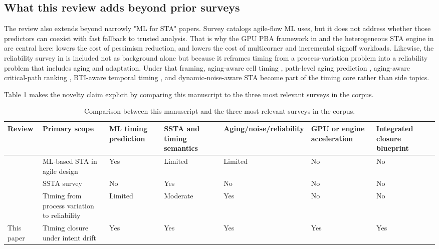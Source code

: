 \documentclass[num-refs]{wiley-article}
\begin{document}
  \subsection{What this review adds beyond prior surveys}

  The review also extends beyond narrowly "ML for STA" papers. Survey \cite{ref20} catalogs agile-flow ML uses, but it does not address whether those predictors can coexist with fast fallback to trusted analysis. That is why the GPU PBA framework in \cite{ref21} and the heterogeneous STA engine in \cite{ref22} are central here: \cite{ref21} lowers the cost of pessimism reduction, and \cite{ref22} lowers the cost of multicorner and incremental signoff workloads. Likewise, the reliability survey in \cite{ref39} is included not as background alone but because it reframes timing from a process-variation problem into a reliability problem that includes aging and adaptation. Under that framing, aging-aware cell timing \cite{ref14}, path-level aging prediction \cite{ref15}, aging-aware critical-path ranking \cite{ref23}, BTI-aware temporal timing \cite{ref44}, and dynamic-noise-aware STA \cite{ref12} become part of the timing core rather than side topics.


  Table 1 makes the novelty claim explicit by comparing this manuscript to the three most relevant surveys in the corpus.


  \begin{table}[tbp]
  \centering
  \caption{Comparison between this manuscript and the three most relevant surveys in the corpus.}
  \label{tab:wiley-1}
  \small
  \begin{tabularx}{\textwidth}{>{\raggedright\arraybackslash}X >{\raggedright\arraybackslash}X >{\raggedright\arraybackslash}X >{\raggedright\arraybackslash}X >{\raggedright\arraybackslash}X >{\raggedright\arraybackslash}X >{\raggedright\arraybackslash}X}
  \toprule
  \textbf{Review} & \textbf{Primary scope} & \textbf{ML timing prediction} & \textbf{SSTA and timing semantics} & \textbf{Aging/noise/reliability} & \textbf{GPU or engine acceleration} & \textbf{Integrated closure blueprint} \\
  \midrule
  \cite{ref20} & ML-based STA in agile design & Yes & Limited & Limited & No & No \\
  \cite{ref49} & SSTA survey & No & Yes & No & No & No \\
  \cite{ref39} & Timing from process variation to reliability & Limited & Moderate & Yes & No & No \\
  This paper & Timing closure under intent drift & Yes & Yes & Yes & Yes & Yes \\
  \bottomrule
  \end{tabularx}
  \end{table}
\end{document}
